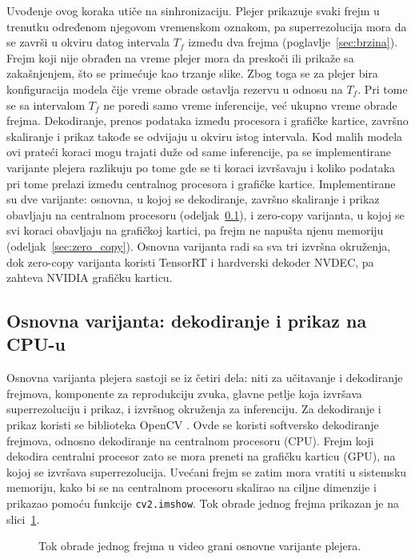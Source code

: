 \documentclass[12pt,a4paper]{article}
\begin{document}
Uvođenje ovog koraka utiče na sinhronizaciju. Plejer prikazuje svaki frejm u trenutku određenom njegovom vremenskom oznakom, pa superrezolucija mora da se završi u okviru datog intervala $T_f$ između dva frejma (poglavlje~\ref{sec:brzina}). Frejm koji nije obrađen na vreme plejer mora da preskoči ili prikaže sa zakašnjenjem, što se primećuje kao trzanje slike. Zbog toga se za plejer bira konfiguracija modela čije vreme obrade ostavlja rezervu u odnosu na $T_f$. Pri tome se sa intervalom $T_f$ ne poredi samo vreme inferencije, već ukupno vreme obrade frejma. Dekodiranje, prenos podataka između procesora i grafičke kartice, završno skaliranje i prikaz takođe se odvijaju u okviru istog intervala. Kod malih modela ovi prateći koraci mogu trajati duže od same inferencije, pa se implementirane varijante plejera razlikuju po tome gde se ti koraci izvršavaju i koliko podataka pri tome prelazi između centralnog procesora i grafičke kartice. Implementirane su dve varijante: osnovna, u kojoj se dekodiranje, završno skaliranje i prikaz obavljaju na centralnom procesoru (odeljak~\ref{sec:osnovna_varijanta}), i zero-copy varijanta, u kojoj se svi koraci obavljaju na grafičkoj kartici, pa frejm ne napušta njenu memoriju (odeljak~\ref{sec:zero_copy}). Osnovna varijanta radi sa sva tri izvršna okruženja, dok zero-copy varijanta koristi TensorRT i hardverski dekoder NVDEC, pa zahteva NVIDIA grafičku karticu.

\subsection{Osnovna varijanta: dekodiranje i prikaz na CPU-u}
\label{sec:osnovna_varijanta}

Osnovna varijanta plejera sastoji se iz četiri dela: niti za učitavanje i dekodiranje frejmova, komponente za reprodukciju zvuka, glavne petlje koja izvršava superrezoluciju i prikaz, i izvršnog okruženja za inferenciju. Za dekodiranje i prikaz koristi se biblioteka OpenCV \cite{OpenCV}. Ovde se koristi softversko dekodiranje frejmova, odnosno dekodiranje na centralnom procesoru (CPU). Frejm koji dekodira centralni procesor zato se mora preneti na grafičku karticu (GPU), na kojoj se izvršava superrezolucija. Uvećani frejm se zatim mora vratiti u sistemsku memoriju, kako bi se na centralnom procesoru skalirao na ciljne dimenzije i prikazao pomoću funkcije \texttt{cv2.imshow}. Tok obrade jednog frejma prikazan je na slici~\ref{fig:plejer_tok}.

\begin{figure}[H]
	\centering
	
	\caption{Tok obrade jednog frejma u video grani osnovne varijante plejera.}
	\label{fig:plejer_tok}
\end{figure}
\end{document}
